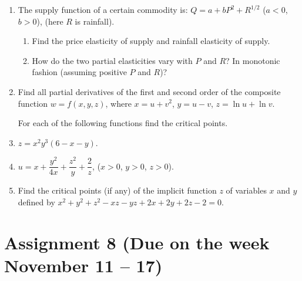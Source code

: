 \documentclass[12pt]{article} %
\theoremstyle{definition} %
\begin{document}
\begin{enumerate}
\item The supply function of a certain commodity is: $Q = a + bP^2 + R^{1/2}$ ($a<0$, $b>0$), (here $R$ is rainfall).
\begin{enumerate}
\item Find the price elasticity of supply and rainfall elasticity of supply.
\item How do the two partial elasticities vary with $P$ and $R$? In monotonic fashion (assuming positive $P$ and $R$)?
\end{enumerate}
\item Find all partial derivatives of the first and second order of the composite function $w=f(x,y,z)$, where $x=u+v^2$, $y=u-v$, $z=\ln u +\ln v$.

\medskip
For each of the following functions find the critical points.

\item $z=x^2y^3 (6-x-y)$.
\item $u=x+\dfrac {y^2}{4x}+\dfrac{z^2}{y}+\dfrac 2z$, ($x>0$, $y>0$, $z>0$).

\item Find the critical points (if any) of the implicit function $z$ of variables $x$ and $y$ defined by $x^2+y^2+z^2-xz-yz+2x+2y+2z-2=0$.
\end{enumerate}


\section*{Assignment 8 (Due on the week November 11 – 17)}
\end{document}
